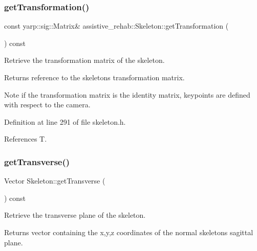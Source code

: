 \subsubsection{\texorpdfstring{getTransformation()}{getTransformation()}}
{\footnotesize\ttfamily const yarp\+::sig\+::\+Matrix\& assistive\+\_\+rehab\+::\+Skeleton\+::get\+Transformation (\begin{DoxyParamCaption}{ }\end{DoxyParamCaption}) const\hspace{0.3cm}{\ttfamily [inline]}}



Retrieve the transformation matrix of the skeleton. 

\begin{DoxyReturn}{Returns}
reference to the skeleton\textquotesingle{}s transformation matrix. 
\end{DoxyReturn}
\begin{DoxyNote}{Note}
if the transformation matrix is the identity matrix, keypoints are defined with respect to the camera. 
\end{DoxyNote}


Definition at line 291 of file skeleton.\+h.


\begin{DoxyCode}{0}

\end{DoxyCode}


References T.

\mbox{\label{classassistive__rehab_1_1Skeleton_a35c3cdea575eb474a2cb8e0186011cff}} 
\subsubsection{\texorpdfstring{getTransverse()}{getTransverse()}}
{\footnotesize\ttfamily Vector Skeleton\+::get\+Transverse (\begin{DoxyParamCaption}{ }\end{DoxyParamCaption}) const}



Retrieve the transverse plane of the skeleton. 

\begin{DoxyReturn}{Returns}
vector containing the x,y,z coordinates of the normal skeleton\textquotesingle{}s sagittal plane. 
\end{DoxyReturn}


